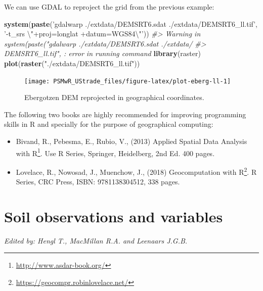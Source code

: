 \documentclass[graybox,natbib,nospthms,UStrade]{svmono}
\newenvironment{Shaded}{\begin{snugshade}}{\end{snugshade}}
\newcommand{\CharTok}[1]{\textcolor[rgb]{0.5,0.5,0.5}{#1}}
\newcommand{\CommentTok}[1]{\textcolor[rgb]{0.37,0.37,0.37}{\textit{#1}}}
\newcommand{\KeywordTok}[1]{\textcolor[rgb]{0.27,0.27,0.27}{\textbf{#1}}}
\newcommand{\NormalTok}[1]{#1}
\newcommand{\StringTok}[1]{\textcolor[rgb]{0.5,0.5,0.5}{#1}}
\renewcommand{\href}[2]{#2 (\url{#1})}
\renewcommand{\href}[2]{#2\footnote{\url{#1}}}
\begin{document}
We can use GDAL to reproject the grid from the previous example:

\begin{Shaded}
\begin{Highlighting}[]
\KeywordTok{system}\NormalTok{(}\KeywordTok{paste}\NormalTok{(}\StringTok{'gdalwarp ./extdata/DEMSRT6.sdat ./extdata/DEMSRT6_ll.tif'}\NormalTok{,  }
             \StringTok{'-t_srs }\CharTok{\textbackslash{}"}\StringTok{+proj=longlat +datum=WGS84}\CharTok{\textbackslash{}"}\StringTok{'}\NormalTok{))}
\CommentTok{#> Warning in system(paste("gdalwarp ./extdata/DEMSRT6.sdat ./extdata/}
\CommentTok{#> DEMSRT6_ll.tif", : error in running command}
\KeywordTok{library}\NormalTok{(raster)}
\KeywordTok{plot}\NormalTok{(}\KeywordTok{raster}\NormalTok{(}\StringTok{"./extdata/DEMSRT6_ll.tif"}\NormalTok{))}
\end{Highlighting}
\end{Shaded}

\begin{figure}[H]

{\centering \texttt{[image: PSMwR\_UStrade\_files/figure-latex/plot-eberg-ll-1]} 

}

\caption{Ebergotzen DEM reprojected in geographical coordinates.}\label{fig:plot-eberg-ll}
\end{figure}

The following two books are highly recommended for improving programming skills in R and specially for the purpose of geographical computing:

\begin{itemize}
\item
  Bivand, R., Pebesma, E., Rubio, V., (2013) \href{http://www.asdar-book.org/}{Applied Spatial Data Analysis with R}. Use R Series, Springer, Heidelberg, 2nd Ed. 400 pages.
\item
  Lovelace, R., Nowosad, J., Muenchow, J., (2018) \href{https://geocompr.robinlovelace.net/}{Geocomputation with R}. R Series, CRC Press, ISBN: 9781138304512, 338 pages.
\end{itemize}

\hypertarget{soil-variables-chapter}{%
\chapter{Soil observations and variables}\label{soil-variables-chapter}}

\emph{Edited by: Hengl T., MacMillan R.A. and Leenaars J.G.B.}
\end{document}
